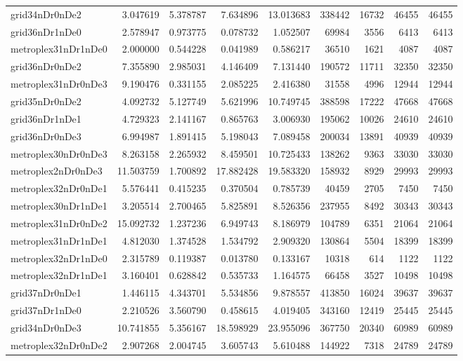 \begin{longtable}{|l|r|r|r|r|r|r|r|r|}
grid34nDr0nDe2 & 3.047619 & 5.378787 & 7.634896 & 13.013683 & 338442 & 16732 & 46455 & 46455 \\
grid36nDr1nDe0 & 2.578947 & 0.973775 & 0.078732 & 1.052507 & 69984 & 3556 & 6413 & 6413 \\
metroplex31nDr1nDe0 & 2.000000 & 0.544228 & 0.041989 & 0.586217 & 36510 & 1621 & 4087 & 4087 \\
grid36nDr0nDe2 & 7.355890 & 2.985031 & 4.146409 & 7.131440 & 190572 & 11711 & 32350 & 32350 \\
metroplex31nDr0nDe3 & 9.190476 & 0.331155 & 2.085225 & 2.416380 & 31558 & 4996 & 12944 & 12944 \\
grid35nDr0nDe2 & 4.092732 & 5.127749 & 5.621996 & 10.749745 & 388598 & 17222 & 47668 & 47668 \\
grid36nDr1nDe1 & 4.729323 & 2.141167 & 0.865763 & 3.006930 & 195062 & 10026 & 24610 & 24610 \\
grid36nDr0nDe3 & 6.994987 & 1.891415 & 5.198043 & 7.089458 & 200034 & 13891 & 40939 & 40939 \\
metroplex30nDr0nDe3 & 8.263158 & 2.265932 & 8.459501 & 10.725433 & 138262 & 9363 & 33030 & 33030 \\
metroplex2nDr0nDe3 & 11.503759 & 1.700892 & 17.882428 & 19.583320 & 158932 & 8929 & 29993 & 29993 \\
metroplex32nDr0nDe1 & 5.576441 & 0.415235 & 0.370504 & 0.785739 & 40459 & 2705 & 7450 & 7450 \\
metroplex30nDr1nDe1 & 3.205514 & 2.700465 & 5.825891 & 8.526356 & 237955 & 8492 & 30343 & 30343 \\
metroplex31nDr0nDe2 & 15.092732 & 1.237236 & 6.949743 & 8.186979 & 104789 & 6351 & 21064 & 21064 \\
metroplex31nDr1nDe1 & 4.812030 & 1.374528 & 1.534792 & 2.909320 & 130864 & 5504 & 18399 & 18399 \\
metroplex32nDr1nDe0 & 2.315789 & 0.119387 & 0.013780 & 0.133167 & 10318 & 614 & 1122 & 1122 \\
metroplex32nDr1nDe1 & 3.160401 & 0.628842 & 0.535733 & 1.164575 & 66458 & 3527 & 10498 & 10498 \\
grid37nDr0nDe1 & 1.446115 & 4.343701 & 5.534856 & 9.878557 & 413850 & 16024 & 39637 & 39637 \\
grid37nDr1nDe0 & 2.210526 & 3.560790 & 0.458615 & 4.019405 & 343160 & 12419 & 25445 & 25445 \\
grid34nDr0nDe3 & 10.741855 & 5.356167 & 18.598929 & 23.955096 & 367750 & 20340 & 60989 & 60989 \\
metroplex32nDr0nDe2 & 2.907268 & 2.004745 & 3.605743 & 5.610488 & 144922 & 7318 & 24789 & 24789 \\

\end{longtable}
